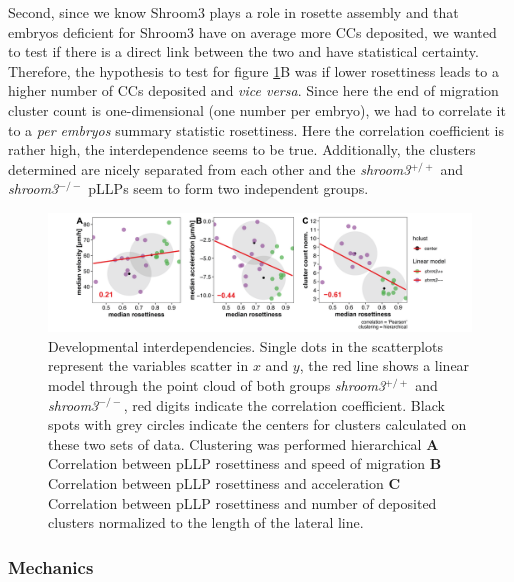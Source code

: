 \documentclass[11pt,singlespacinge,twoside]{reedthesis} %
\theoremstyle{definition}
\theoremstyle{definition}
\theoremstyle{definition}
\theoremstyle{remark}
\begin{document}
Second, since we know Shroom3 plays a role in rosette assembly and that embryos deficient for Shroom3 have on average more CCs deposited, we wanted to test if there is a direct link between the two and have statistical certainty. Therefore, the hypothesis to test for figure \ref{fig:rdtcorr}B was if lower rosettiness leads to a higher number of CCs deposited and \emph{vice versa}. Since here the end of migration cluster count is one-dimensional (one number per embryo), we had to correlate it to a \emph{per embryos} summary statistic rosettiness. Here the correlation coefficient is rather high, the interdependence seems to be true. Additionally, the clusters determined are nicely separated from each other and the \emph{shroom3}\(^{+/+}\) and \emph{shroom3}\(^{-/-}\) pLLPs seem to form two independent groups.


\begin{figure}[H]

{\centering \includegraphics[width=1\linewidth]{figures/results/03_rosettes/rdt_cor_velo_acc_depo} 

}

\caption[Developmental interdependencies]{Developmental interdependencies. Single dots in the scatterplots represent the variables scatter in \(x\) and \(y\), the red line shows a linear model through the point cloud of both groups \emph{shroom3}\(^{+/+}\) and \emph{shroom3}\(^{-/-}\), red digits indicate the correlation coefficient. Black spots with grey circles indicate the centers for clusters calculated on these two sets of data. Clustering was performed hierarchical \textbf{A} Correlation between pLLP rosettiness and speed of migration \textbf{B} Correlation between pLLP rosettiness and acceleration \textbf{C} Correlation between pLLP rosettiness and number of deposited clusters normalized to the length of the lateral line.}\label{fig:rdtcorr}
\end{figure}
\hypertarget{res-rockresc}{%
\subsubsection{Mechanics}\label{res-rockresc}}
\end{document}
